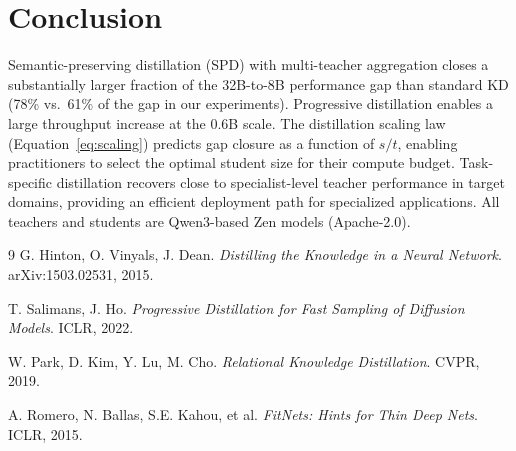 \documentclass[11pt,a4paper]{article}
\begin{document}
\section{Conclusion}
\label{sec:conclusion}

Semantic-preserving distillation (SPD) with multi-teacher aggregation closes a
substantially larger fraction of the 32B-to-8B performance gap than standard KD (78\% vs.\
61\% of the gap in our experiments). Progressive distillation enables a large throughput
increase at the 0.6B scale. The distillation scaling law (Equation~\ref{eq:scaling})
predicts gap closure as a function of $s/t$, enabling practitioners to select the optimal
student size for their compute budget. Task-specific distillation recovers close to
specialist-level teacher performance in target domains, providing an efficient deployment
path for specialized applications. All teachers and students are Qwen3-based Zen models
(Apache-2.0).

\begin{thebibliography}{9}
G. Hinton, O. Vinyals, J. Dean.
\textit{Distilling the Knowledge in a Neural Network}.
arXiv:1503.02531, 2015.

T. Salimans, J. Ho.
\textit{Progressive Distillation for Fast Sampling of Diffusion Models}.
ICLR, 2022.

W. Park, D. Kim, Y. Lu, M. Cho.
\textit{Relational Knowledge Distillation}.
CVPR, 2019.

A. Romero, N. Ballas, S.E. Kahou, et al.
\textit{FitNets: Hints for Thin Deep Nets}.
ICLR, 2015.
\end{thebibliography}
\end{document}
